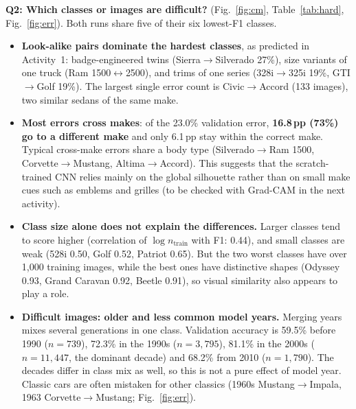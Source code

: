 \documentclass[10pt,a4paper,twocolumn]{article}
\newcommand{\hl}[1]{\textbf{#1}}
\begin{document}
\hl{Q2: Which classes or images are difficult?} (Fig.~\ref{fig:cm}, Table~\ref{tab:hard}, Fig.~\ref{fig:err}).
Both runs share five of their six lowest-F1 classes.
\begin{itemize}
  \item \hl{Look-alike pairs dominate the hardest classes}, as predicted in Activity~1:
  badge-engineered twins (Sierra$\rightarrow$Silverado 27\%), size variants of one truck (Ram 1500$\leftrightarrow$2500),
  and trims of one series (328i$\rightarrow$325i 19\%, GTI$\rightarrow$Golf 19\%). The largest single error count is
  Civic$\rightarrow$Accord (133 images), two similar sedans of the same make.
  \item \hl{Most errors cross makes}: of the 23.0\% validation error, \hl{16.8\,pp (73\%) go to a different make}
  and only 6.1\,pp stay within the correct make. Typical cross-make errors share a body type
  (Silverado$\rightarrow$Ram 1500, Corvette$\rightarrow$Mustang, Altima$\rightarrow$Accord). This suggests that the
  scratch-trained CNN relies mainly on the global silhouette rather than on small make cues such as emblems and grilles
  (to be checked with Grad-CAM in the next activity).
  \item \hl{Class size alone does not explain the differences.} Larger classes tend to score higher
  (correlation of $\log n_\text{train}$ with F1: 0.44), and small classes are weak (528i 0.50, Golf 0.52, Patriot 0.65).
  But the two worst classes have over 1,000 training images, while the best ones have distinctive shapes
  (Odyssey 0.93, Grand Caravan 0.92, Beetle 0.91), so visual similarity also appears to play a role.
  \item \hl{Difficult images: older and less common model years.} Merging years mixes several generations in one class.
  Validation accuracy is 59.5\% before 1990 ($n{=}739$), 72.3\% in the 1990s ($n{=}3{,}795$), 81.1\% in the 2000s
  ($n{=}11{,}447$, the dominant decade) and 68.2\% from 2010 ($n{=}1{,}790$). The decades differ in class mix as well,
  so this is not a pure effect of model year. Classic cars are often mistaken for other classics
  (1960s Mustang$\rightarrow$Impala, 1963 Corvette$\rightarrow$Mustang; Fig.~\ref{fig:err}).
\end{itemize}

\end{document}
